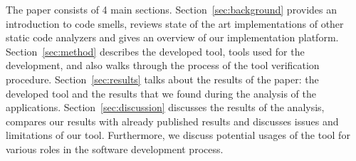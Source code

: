 The paper consists of 4 main sections.
Section~\ref{sec:background} provides an introduction to code smells, reviews state of the art implementations
of other static code analyzers and gives an overview of our implementation platform.
Section~\ref{sec:method} describes the developed tool, tools used for the development, and also walks through
the process of the tool verification procedure.
Section~\ref{sec:results} talks about the results of the paper: the developed tool and the results that we found
during the analysis of the applications.
Section~\ref{sec:discussion} discusses the results of the analysis, compares our results with already published results and
discusses issues and limitations of our tool.
Furthermore, we discuss potential usages of the tool for various roles in the software development process.
